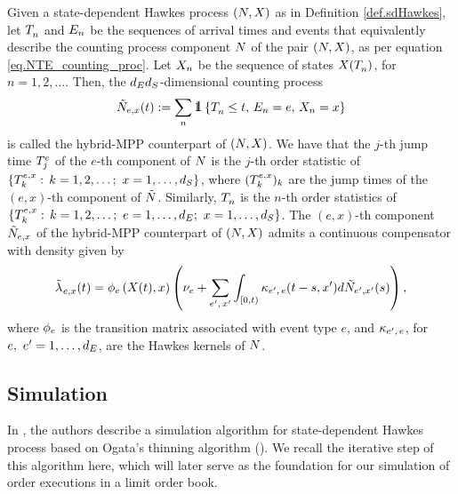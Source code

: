\documentclass[10pt]{article}
\begin{document}
Given a state-dependent Hawkes process $(\multiCountingProc, \stateVariable)$ as in Definition \ref{def.sdHawkes}, let $\arrivalTimes[]_n$ and $\event[n]$ be the sequences of arrival times and events that equivalently describe the counting process component $\multiCountingProc$ of the pair $(\multiCountingProc, \stateVariable)$, as per equation \eqref{eq.NTE_counting_proc}. Let $\stateVariable_n$ be the sequence of states $X(\arrivalTimes[]_n)$, for $n=1,2,\dots$. Then, the 
$\numEventTypes\numStates$-dimensional counting process
\begin{equation}\label{eq.hybridHawkes}
 \hybridHawkes_{e,x}(t) := 
 \sum_{n} \one \left\lbrace \arrivalTimes[]_n \leq t, \, \event[n] = e, \, 
 \stateVariable_n = x \right\rbrace
\end{equation}
is called the hybrid-MPP counterpart of  $(\multiCountingProc, \stateVariable)$.
We have that the $j$-th jump time $\arrivalTimes[e]_j$ of the $e$-th component of $\multiCountingProc$ is the $j$-th order statistic of $\lbrace \arrivalTimes[e,x]_k: \, k=1,2,\dots; \, \, x=1,\dots,\numStates \rbrace$, where $(\arrivalTimes[e,x]_k)_k$ are the jump times of the $(e,x)$-th component of $\hybridHawkes$. Similarly, $\arrivalTimes[]_n$ is the $n$-th order statistics of $\lbrace \arrivalTimes[e,x]_k: \, k=1,2,\dots; \, \, e=1,\dots, \numEventTypes; \, \,  x=1,\dots,\numStates \rbrace$. The $(e,x)$-th component $ \hybridHawkes_{e,x}$ of the hybrid-MPP counterpart of $(\multiCountingProc, \stateVariable)$ admits a continuous compensator with density given by 
\begin{equation}\label{eq.density_of_hybridMPPcounterpart}
 \hybridIntensity_{e,x}(t) 
 =
 \transProb_{e}\left(\stateVariable(t),x\right)
 \left(
 \baseRate_e
 +\sum_{\eone,\, \xone} \int_{[0,t)} \hawkesKernel\subscriptee(t-s,\xone)d\hybridHawkes_{\eone,\xone}(s)
 \right),
\end{equation}
where $\transProb_{e}$ is the transition matrix associated with event type $e$, and $\hawkesKernel\subscriptee$, for $e,\, \, \eone = 1,\dots,\numEventTypes$, are the Hawkes kernels of $\multiCountingProc$.


\subsection{Simulation}\label{sec.simulation}
In \citealp{MP18sta}, the authors describe a simulation algorithm for state-dependent Hawkes process based on Ogata's thinning algorithm (\citealp{Oga81lew}). We recall the iterative step of this algorithm here, which will later serve as the foundation for our simulation of order executions in a limit order book.
\end{document}
